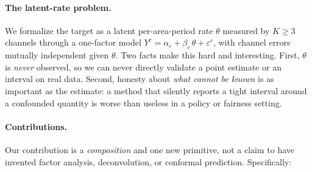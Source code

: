 \documentclass[11pt]{article}
\theoremstyle{definition}
\theoremstyle{remark}
\newcommand{\eps}{\varepsilon}
\begin{document}
\paragraph{The latent-rate problem.}
We formalize the target as a latent per-area-period rate $\theta$ measured
by $K \ge 3$ channels through a one-factor model
$Y^c = \alpha_c + \beta_c\,\theta + \eps^c$, with channel errors mutually
independent given $\theta$. Two facts make this hard and interesting. First,
$\theta$ is \emph{never} observed, so we can never directly validate a
point estimate or an interval on real data. Second, honesty about
\emph{what cannot be known} is as important as the estimate: a method that
silently reports a tight interval around a confounded quantity is worse than
useless in a policy or fairness setting.

\paragraph{Contributions.}
Our contribution is a \emph{composition} and one new primitive, not a claim
to have invented factor analysis, deconvolution, or conformal prediction.
Specifically:
\end{document}
